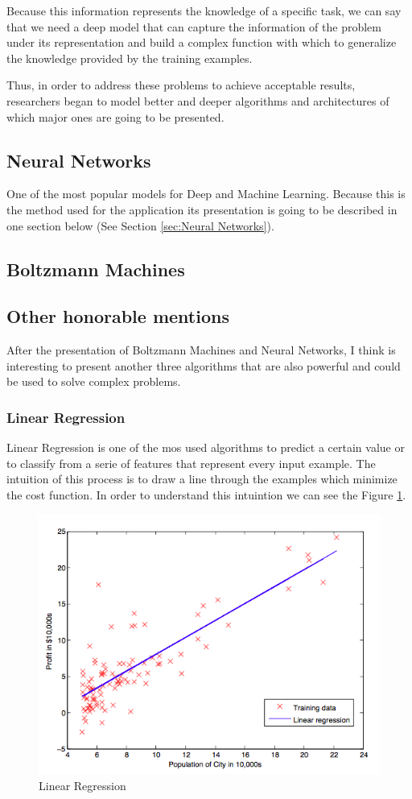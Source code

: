 \documentclass[12pt]{article}
\begin{document}
Because this information represents the knowledge of a specific task, we can say that we need a deep model that can capture the information of the problem under its representation and build a complex function with which to generalize the knowledge provided by the training examples.

Thus, in order to address these problems to achieve acceptable results, researchers began to model better and deeper algorithms and architectures of which major ones are going to be presented.

\subsection{Neural Networks}
One of the most popular models for Deep and Machine Learning. Because this is the method used for the application its presentation is going to be described in one section below (See Section \ref{sec:Neural Networks}).

\subsection{Boltzmann Machines}

\subsection{Other honorable mentions}
After the presentation of Boltzmann Machines and Neural Networks, I think is interesting to present another three algorithms that are also powerful and could be used to solve complex problems.

\subsubsection{Linear Regression}
Linear Regression is one of the mos used algorithms to predict a certain value or to classify from a serie of features that represent every input example. The intuition of this process is to draw a line through the examples which minimize the cost function. In order to understand this intuintion we can see the Figure \ref{fig:figure3}.

\begin{figure}[ht]
\centering
\includegraphics[width=.4\textwidth]{Regression.png}
\caption{Linear Regression}
\label{fig:figure3}
\end{figure}
\end{document}
